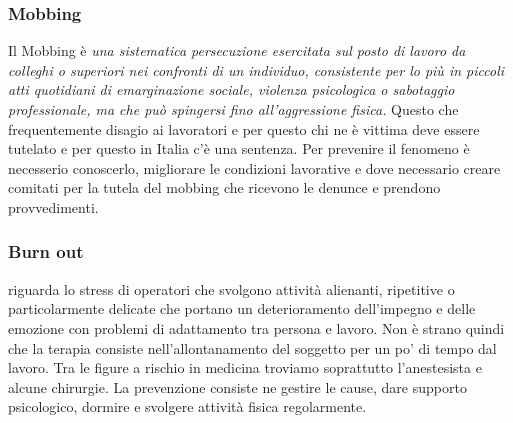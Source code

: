 \subsubsection{Mobbing}

Il Mobbing è \emph{una sistematica persecuzione esercitata sul posto di
lavoro da colleghi o superiori nei confronti di un individuo,
consistente per lo più in piccoli atti quotidiani di emarginazione
sociale, violenza psicologica o sabotaggio professionale, ma che può
spingersi fino all'aggressione fisica.} Questo che frequentemente
disagio ai lavoratori e per questo chi ne è vittima deve essere tutelato
e per questo in Italia c'è una sentenza. Per prevenire il fenomeno è
necesserio conoscerlo, migliorare le condizioni lavorative e dove
necessario creare comitati per la tutela del mobbing che ricevono le
denunce e prendono provvedimenti.

\subsubsection{Burn out}

riguarda lo stress di operatori che svolgono attività alienanti,
ripetitive o particolarmente delicate che portano un deterioramento
dell'impegno e delle emozione con problemi di adattamento tra persona e
lavoro. Non è strano quindi che la terapia consiste nell'allontanamento
del soggetto per un po' di tempo dal lavoro. Tra le figure a rischio in
medicina troviamo soprattutto l'anestesista e alcune chirurgie. La
prevenzione consiste ne gestire le cause, dare supporto psicologico,
dormire e svolgere attività fisica regolarmente.